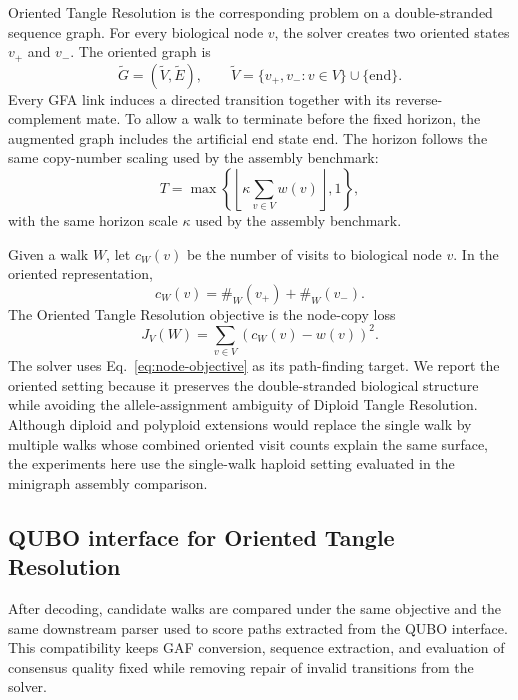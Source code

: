 \documentclass[11pt]{article}
\newcommand{\Vori}{\widetilde V}
\newcommand{\Eori}{\widetilde E}
\newcommand{\Vend}{\mathrm{end}}
\begin{document}
Oriented Tangle Resolution is the corresponding problem on a double-stranded sequence graph. For every biological node $v$, the solver creates two oriented states $v_+$ and $v_-$. The oriented graph is
\begin{equation}
\widetilde G=(\Vori,\Eori),\qquad \Vori=\{v_+,v_-:v\in V\}\cup\{\Vend\}.
\end{equation}
Every GFA link induces a directed transition together with its reverse-complement mate. To allow a walk to terminate before the fixed horizon, the augmented graph includes the artificial end state $\Vend$. The horizon follows the same copy-number scaling used by the assembly benchmark:
\begin{equation}
T=\max\left\{\left\lfloor \kappa \sum_{v\in V} w(v)\right\rfloor,1\right\},
\label{eq:horizon}
\end{equation}
with the same horizon scale $\kappa$ used by the assembly benchmark.

Given a walk $W$, let $c_W(v)$ be the number of visits to biological node $v$. In the oriented representation,
\begin{equation}
c_W(v)=\#_W(v_+)+\#_W(v_-).
\label{eq:oriented-count}
\end{equation}
The Oriented Tangle Resolution objective is the node-copy loss
\begin{equation}
J_V(W)=\sum_{v\in V}\left(c_W(v)-w(v)\right)^2.
\label{eq:node-objective}
\end{equation}
The solver uses Eq.~\eqref{eq:node-objective} as its path-finding target. We report the oriented setting because it preserves the double-stranded biological structure while avoiding the allele-assignment ambiguity of Diploid Tangle Resolution. Although diploid and polyploid extensions would replace the single walk by multiple walks whose combined oriented visit counts explain the same surface, the experiments here use the single-walk haploid setting evaluated in the minigraph assembly comparison.

\subsection{QUBO interface for Oriented Tangle Resolution}

After decoding, candidate walks are compared under the same objective and the same downstream parser used to score paths extracted from the QUBO interface. This compatibility keeps GAF conversion, sequence extraction, and evaluation of consensus quality fixed while removing repair of invalid transitions from the solver.
\end{document}
